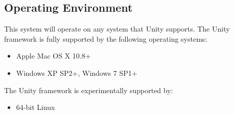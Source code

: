\subsection{Operating Environment}
This system will operate on any system that Unity supports. The Unity framework is fully supported by the following operating systems:
\begin{itemize}
    \item Apple Mac OS X 10.8+
    \item Windows XP SP2+, Windows 7 SP1+
\end{itemize}
The Unity framework is experimentally supported by:
\begin{itemize}
    \item 64-bit Linux
\end{itemize}
